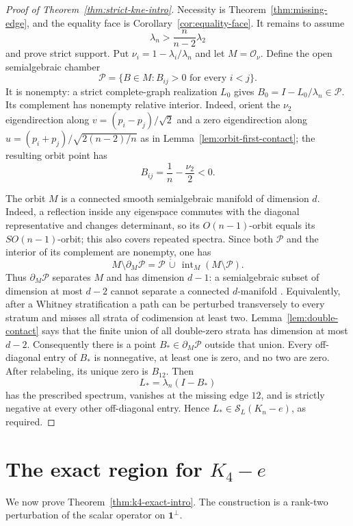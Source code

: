 \documentclass[11pt,reqno]{amsart}
\theoremstyle{definition}
\theoremstyle{remark}
\newcommand{\one}{\mathbf 1}
\newcommand{\SL}{\mathcal S_L}
\begin{document}
\begin{proof}[Proof of Theorem~\ref{thm:strict-kne-intro}]
Necessity is Theorem~\ref{thm:missing-edge}, and the equality face is
Corollary~\ref{cor:equality-face}.  It remains to assume
\[
 \lambda_n>\frac{n}{n-2}\lambda_2
\]
and prove strict support.  Put
$\nu_i=1-\lambda_i/\lambda_n$ and let $M=\mathcal O_\nu$.  Define the open
semialgebraic chamber
\[
 \mathcal P=\{B\in M:B_{ij}>0\text{ for every }i<j\}.
\]
It is nonempty: a strict complete-graph realization $L_0$ gives
$B_0=I-L_0/\lambda_n\in\mathcal P$.  Its complement has nonempty relative
interior.  Indeed, orient the $\nu_2$ eigendirection along
$v=(p_i-p_j)/\sqrt2$ and a zero eigendirection along
$u=(p_i+p_j)/\sqrt{2(n-2)/n}$ as in
Lemma~\ref{lem:orbit-first-contact}; the resulting orbit point has
\[
 B_{ij}=\frac1n-\frac{\nu_2}{2}<0.
\]

The orbit $M$ is a connected smooth semialgebraic manifold of dimension
$d$.  Indeed, a reflection inside any eigenspace commutes with the diagonal
representative and changes determinant, so its $O(n-1)$-orbit equals its
$SO(n-1)$-orbit; this also covers repeated spectra.  Since both
$\mathcal P$ and the interior of its complement are nonempty, one has
\[
  M\setminus\partial_M\mathcal P
  =\mathcal P\,\dot\cup\,
    \operatorname{int}_M(M\setminus\mathcal P).
\]
Thus $\partial_M\mathcal P$ separates $M$ and has dimension $d-1$: a
semialgebraic subset of dimension at most $d-2$ cannot separate a connected
$d$-manifold
\cite[Chapter~2]{BCR1998}.  Equivalently, after a Whitney stratification a
path can be perturbed transversely to every stratum and misses all strata of
codimension at least two.  Lemma~\ref{lem:double-contact} says that the
finite union of all double-zero strata has dimension at most $d-2$.
Consequently there is a point $B_*\in\partial_M\mathcal P$ outside that
union.  Every off-diagonal entry of $B_*$ is nonnegative, at least one is
zero, and no two are zero.  After relabeling, its unique zero is $B_{12}$.
Then
\[
 L_*=\lambda_n(I-B_*)
\]
has the prescribed spectrum, vanishes at the missing edge $12$, and is
strictly negative at every other off-diagonal entry.  Hence
$L_*\in\SL(K_n-e)$, as required.
\end{proof}

\section{The exact region for \texorpdfstring{$K_4-e$}{K4-e}}\label{sec:k4}

We now prove Theorem~\ref{thm:k4-exact-intro}.  The construction is a
rank-two perturbation of the scalar operator on $\one^\perp$.
\end{document}
